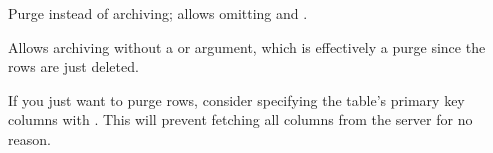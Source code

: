 \documentclass[letterpaper,10pt,english]{sphinxmanual}
\begin{document}

\begin{fulllineitems}
\label{\detokenize{mariadb-archiver:cmdoption-mariadb-archiver-purge}}
Purge instead of archiving; allows omitting {\hyperref[\detokenize{mariadb-archiver:cmdoption-mariadb-archiver-file}]{}} and {\hyperref[\detokenize{mariadb-archiver:cmdoption-mariadb-archiver-dest}]{}}.

Allows archiving without a {\hyperref[\detokenize{mariadb-archiver:cmdoption-mariadb-archiver-file}]{}} or {\hyperref[\detokenize{mariadb-archiver:cmdoption-mariadb-archiver-dest}]{}} argument, which is
effectively a purge since the rows are just deleted.

If you just want to purge rows, consider specifying the table’s primary key
columns with {\hyperref[\detokenize{mariadb-archiver:cmdoption-mariadb-archiver-primary-key-only}]{}}.  This will prevent fetching all columns
from the server for no reason.

\end{fulllineitems}

\end{document}
